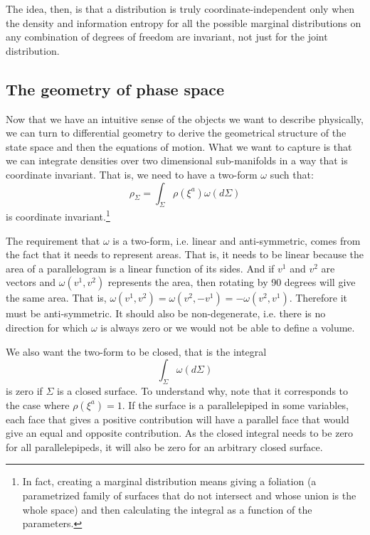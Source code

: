 \documentclass[11pt]{elsarticle}
\begin{document}
The idea, then, is that a distribution is truly coordinate-independent only when the density and information entropy for all the possible marginal distributions on any combination of degrees of freedom are invariant, not just for the joint distribution.

\subsection*{The geometry of phase space}

Now that we have an intuitive sense of the objects we want to describe physically, we can turn to differential geometry to derive the geometrical structure of the state space and then the equations of motion. What we want to capture is that we can integrate densities over two dimensional sub-manifolds in a way that is coordinate invariant. That is, we need to have a two-form $\omega$ such that:
\begin{equation}
\rho_\Sigma = \int_\Sigma \rho(\xi^a) \omega(d\Sigma)
\end{equation}
is coordinate invariant.\footnote{In fact, creating a marginal distribution means giving a foliation (a parametrized family of surfaces that do not intersect and whose union is the whole space) and then calculating the integral as a function of the parameters.}

The requirement that $\omega$ is a two-form, i.e. linear and anti-symmetric, comes from the fact that it needs to represent areas. That is, it needs to be linear because the area of a parallelogram is a linear function of its sides. And if $v^1$ and $v^2$ are vectors and $\omega(v^1, v^2)$ represents the area, then rotating by 90 degrees will give the same area. That is, $\omega(v^1, v^2) = \omega(v^2, -v^1) = -\omega(v^2, v^1)$. Therefore it must be anti-symmetric. It should also be non-degenerate, i.e. there is no direction for which $\omega$ is always zero or we would not be able to define a volume.

We also want the two-form to be closed, that is the integral
\begin{equation}
\int_\Sigma \omega(d\Sigma)
\end{equation}
is zero if $\Sigma$ is a closed surface. To understand why, note that it corresponds to the case where $\rho(\xi^a)=1$. If the surface is a parallelepiped in some variables, each face that gives a positive contribution will have a parallel face that would give an equal and opposite contribution. As the closed integral needs to be zero for all parallelepipeds, it will also be zero for an arbitrary closed surface.
\end{document}
